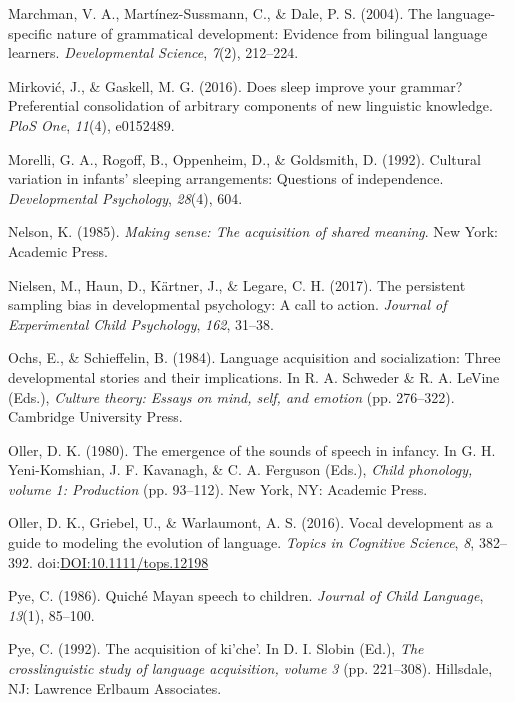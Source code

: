 \documentclass[floatsintext,man]{apa6}
\theoremstyle{definition}
\theoremstyle{definition}
\theoremstyle{definition}
\theoremstyle{remark}
\begin{document}
\hypertarget{ref-marchman2004language}{}
Marchman, V. A., Martínez-Sussmann, C., \& Dale, P. S. (2004). The
language-specific nature of grammatical development: Evidence from
bilingual language learners. \emph{Developmental Science}, \emph{7}(2),
212--224.

\hypertarget{ref-mirkovic2016does}{}
Mirković, J., \& Gaskell, M. G. (2016). Does sleep improve your grammar?
Preferential consolidation of arbitrary components of new linguistic
knowledge. \emph{PloS One}, \emph{11}(4), e0152489.

\hypertarget{ref-morelli1992cultural}{}
Morelli, G. A., Rogoff, B., Oppenheim, D., \& Goldsmith, D. (1992).
Cultural variation in infants' sleeping arrangements: Questions of
independence. \emph{Developmental Psychology}, \emph{28}(4), 604.

\hypertarget{ref-nelson1985making}{}
Nelson, K. (1985). \emph{Making sense: The acquisition of shared
meaning}. New York: Academic Press.

\hypertarget{ref-nielsen2017persistent}{}
Nielsen, M., Haun, D., Kärtner, J., \& Legare, C. H. (2017). The
persistent sampling bias in developmental psychology: A call to action.
\emph{Journal of Experimental Child Psychology}, \emph{162}, 31--38.

\hypertarget{ref-ochs1984language}{}
Ochs, E., \& Schieffelin, B. (1984). Language acquisition and
socialization: Three developmental stories and their implications. In R.
A. Schweder \& R. A. LeVine (Eds.), \emph{Culture theory: Essays on
mind, self, and emotion} (pp. 276--322). Cambridge University Press.

\hypertarget{ref-oller1980emergence}{}
Oller, D. K. (1980). The emergence of the sounds of speech in infancy.
In G. H. Yeni-Komshian, J. F. Kavanagh, \& C. A. Ferguson (Eds.),
\emph{Child phonology, volume 1: Production} (pp. 93--112). New York,
NY: Academic Press.

\hypertarget{ref-oller2016vocal}{}
Oller, D. K., Griebel, U., \& Warlaumont, A. S. (2016). Vocal
development as a guide to modeling the evolution of language.
\emph{Topics in Cognitive Science}, \emph{8}, 382--392.
doi:\href{https://doi.org/DOI:10.1111/tops.12198}{DOI:10.1111/tops.12198}

\hypertarget{ref-pye1986quiche}{}
Pye, C. (1986). Quiché Mayan speech to children. \emph{Journal of Child
Language}, \emph{13}(1), 85--100.

\hypertarget{ref-pye1992acquisition}{}
Pye, C. (1992). The acquisition of ki'che'. In D. I. Slobin (Ed.),
\emph{The crosslinguistic study of language acquisition, volume 3} (pp.
221--308). Hillsdale, NJ: Lawrence Erlbaum Associates.
\end{document}
